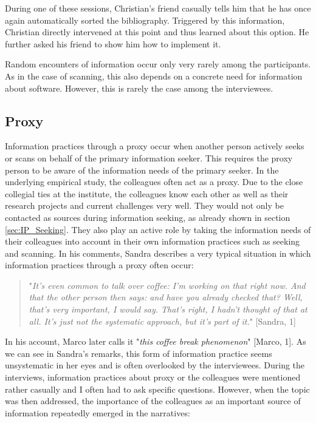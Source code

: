 \documentclass[12pt, a4paper, titlepage, oneside, abstract=true, toc=listof, toc=bibliography]{scrreprt}
\begin{document}
{During one of these sessions, Christian's friend casually tells him that he has once again automatically sorted the bibliography. Triggered by this information, Christian directly intervened at this point and thus learned about this option. He further asked his friend to show him how to implement it. 

Random encounters of information occur only very rarely among the participants. As in the case of scanning, this also depends on a concrete need for information about software. However, this is rarely the case among the interviewees. 

\subsection{Proxy}
\label{sec:IP_Proxy}
Information practices through a proxy occur when another person actively seeks or scans on behalf of the primary information seeker. 
This requires the proxy person to be aware of the information needs of the primary seeker. In the underlying empirical study, the colleagues often act as a proxy. Due to the close collegial ties at the institute, the colleagues know each other as well as their research projects and current challenges very well. They would not only be contacted as sources during information seeking, as already shown in section \ref{sec:IP_Seeking}. They also play an active role by taking the information needs of their colleagues into account in their own information practices such as seeking and scanning. In his comments, Sandra describes a very typical situation in which information practices through a proxy often occur:

\begin{quotation}
"\textit{It's even common to talk over coffee: I'm working on that right now.  And that the other person then says: and have you already checked that? Well, that's very important, I would say. That's right, I hadn't thought of that at all. It's just not the systematic approach, but it's part of it.}" [Sandra, 1]
\end{quotation}

In his account, Marco later calls it "\textit{this coffee break phenomenon}" [Marco, 1]. As we can see in Sandra's remarks, this form of information practice seems unsystematic in her eyes and is often overlooked by the interviewees. During the interviews, information practices about proxy or the colleagues were mentioned rather casually and I often had to ask specific questions. However, when the topic was then addressed, the importance of the colleagues as an important source of information repeatedly emerged in the narratives: 

}
\end{document}
